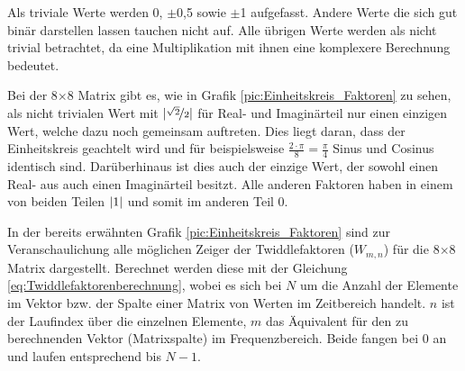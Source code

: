  
%  
 
 
 Als triviale Werte werden 0, $\pm$0,5 sowie $\pm$1 aufgefasst.
 Andere Werte die sich gut binär darstellen lassen
 tauchen nicht auf. Alle übrigen Werte werden als nicht trivial betrachtet, da eine Multiplikation mit ihnen
 eine komplexere Berechnung bedeutet.
 
 Bei der 8$\times$8 Matrix gibt es, wie in Grafik \ref{pic:Einheitskreis_Faktoren} zu sehen, als nicht trivialen Wert mit $\lvert\nicefrac{\sqrt{2}}{2}\rvert$ für Real- und 
 Imaginärteil nur einen einzigen Wert, welche dazu noch gemeinsam auftreten. Dies liegt daran, dass
 der Einheitskreis geachtelt wird und für beispielsweise $\frac{2\cdot\pi}{8}=\frac{\pi}{4}$ Sinus und Cosinus identisch sind. Darüberhinaus ist dies auch 
 der einzige Wert, der sowohl einen Real- aus auch einen Imaginärteil besitzt. Alle anderen Faktoren haben in einem von beiden Teilen $\lvert1\rvert$ und somit im anderen Teil 0.
 
 In der bereits erwähnten Grafik \ref{pic:Einheitskreis_Faktoren} sind zur Veranschaulichung alle möglichen Zeiger der Twiddlefaktoren ($W_{m,n}$) für die 8$\times$8 Matrix dargestellt. 
 Berechnet werden diese mit der
 Gleichung \ref{eq:Twiddlefaktorenberechnung}, wobei es sich bei $N$ um die Anzahl der Elemente im Vektor bzw. der Spalte einer Matrix von Werten im Zeitbereich 
 handelt. $n$ ist der Laufindex über die einzelnen Elemente, $m$ das Äquivalent für den zu berechnenden Vektor (Matrixspalte) im Frequenzbereich. Beide 
 fangen bei 0 an und laufen entsprechend bis $N-1$.


